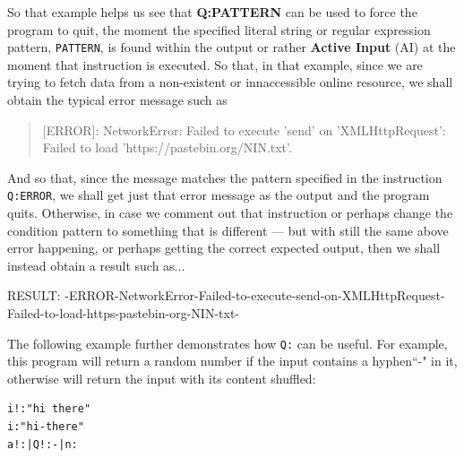 \documentclass[a4paper, 18pt]{book} %
\begin{document}
{{\vspace{2em}


So that example helps us see that \textbf{Q:PATTERN} can be used to force the program to quit, the moment the specified literal string or regular expression pattern, \texttt{PATTERN}, is found within the output or rather \textbf{Active Input} (AI) at the moment that instruction is executed. So that, in that example, since we are trying to fetch data from a non-existent or innaccessible online resource, we shall obtain the typical error message such as 

\vspace{2em}

\begin{verse}
[ERROR]: NetworkError: Failed to execute 'send' on 'XMLHttpRequest': Failed to load 'https://pastebin.org/NIN.txt'.
\end{verse}

\vspace{2em}


And so that, since the message matches the pattern specified in the instruction \texttt{Q:ERROR}, we shall get just that error message as the output and the program quits. Otherwise, in case we comment out that instruction or perhaps change the condition pattern to something that is different --- but with still the same above error happening, or perhaps getting the correct expected output, then we shall instead obtain a result such as...

\vspace{1em}


  \begin{tcbverbatim}[title=Output from (Modified) Example 1]
RESULT: -ERROR-NetworkError-Failed-to-execute-send-on-XMLHttpRequest-Failed-to-load-https-pastebin-org-NIN-txt-
  \end{tcbverbatim}
  
\vspace{1em}
  
The following example further demonstrates how \texttt{Q:} can be useful. For example, this program will return a random number if the input contains a hyphen``-" in it, otherwise will return the input with its content shuffled:


\vspace{1em}

  \begin{tcolorbox}[teaterminalstyle, title=Q: EXAMPLE 2: Using Q for Control-Flow and Dynamic Outputs, breakable]
  \begin{lstlisting}[language=TEA,breaklines=true,]
i!:"hi there"
i:"hi-there"
a!:|Q!:-|n: 
   \end{lstlisting}
  \end{tcolorbox}

}}
\end{document}
